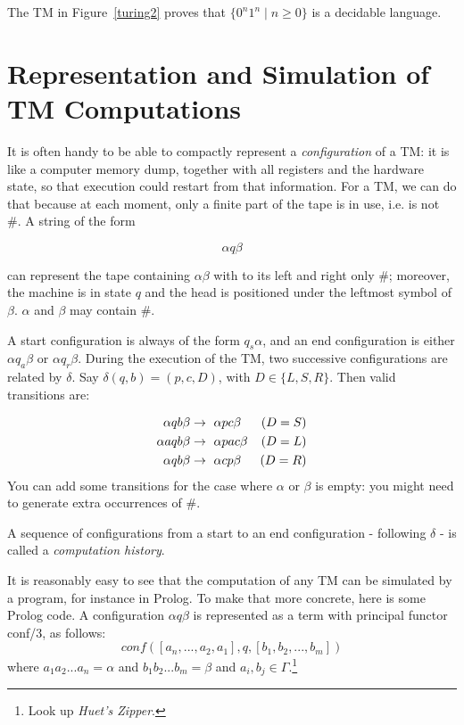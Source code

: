 The TM in Figure~\ref{turing2} proves that
%
$\{0^n1^n\mid n \geq 0\}$ is a decidable language.


\section{Representation and Simulation of TM Computations}

It is often handy to be able to compactly represent a {\em
  configuration} of a TM: it is like a computer memory dump, together
with all registers and the hardware state, so that execution could
restart from that information. For a TM, we can do that because at
each moment, only a finite part of the tape is in use, i.e. is not \#. A string of the form

\begin{equation*}
	\alpha q \beta
\end{equation*}

can represent the tape containing $\alpha\beta$ with to its left and
right only \#; moreover, the machine is in state $q$ and the head is
positioned under the leftmost symbol of $\beta$. $\alpha$ and $\beta$
may contain \#.

A start configuration is always of the form $q_s\alpha$, and an end
configuration is either $\alpha q_a \beta$ or $\alpha q_r \beta$. During the execution of the TM, two successive configurations are
related by $\delta$. Say $\delta(q,b) = (p,c,D)$, with $D\in\{L,S,R\}$. Then valid transitions are:

\begin{align*}
	\alpha q b \beta &\rightarrow~ \alpha p c \beta & (D = S) \\
	\alpha a q b \beta &\rightarrow~ \alpha p a c \beta & (D = L) \\
	\alpha q b \beta &\rightarrow~ \alpha c p \beta & (D = R)
\end{align*}
You can add some transitions for the case where $\alpha$ or $\beta$ is
empty: you might need to generate extra occurrences of \#.


A sequence of configurations from a start to an end configuration -
following $\delta$ - is called a {\em computation history}.

It is reasonably easy to see that the computation of any TM can be
simulated by a program, for instance in Prolog. To make that more
concrete, here is some Prolog code. A configuration $\alpha q \beta$
is represented as a term with principal functor conf/3, as follows:
\begin{equation*}
	conf([a_n, ... , a_2,a_1],q,[b_1,b_2,...,b_m])
\end{equation*}
where $a_1a_2...a_n = \alpha$ and $b_1b_2...b_m = \beta$ and $a_i, b_j \in \Gamma$.\footnote{Look up {\em Huet's Zipper}.}

